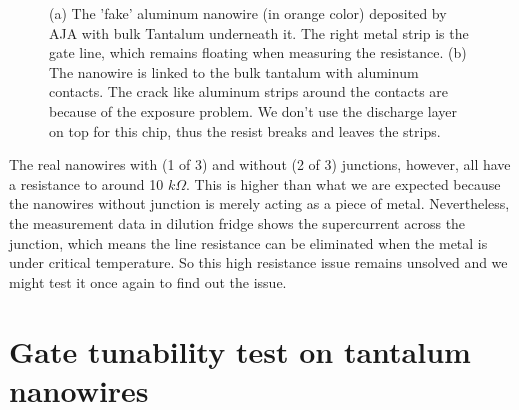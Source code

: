 \begin{figure}[h!]
\begin{subfigure}[b]{0.48\textwidth}
         \caption{}
         \label{}
     \end{subfigure}
     \caption{(a) The 'fake' aluminum nanowire (in orange color) deposited by AJA with bulk Tantalum underneath it. The right metal strip is the gate line, which remains floating when measuring the resistance. (b) The nanowire is linked to the bulk tantalum with aluminum contacts. The crack like aluminum strips around the contacts are because of the exposure problem. We don't use the discharge layer on top for this chip, thus the resist breaks and leaves the strips.}
    \label{Tamilling}
\end{figure}

The real nanowires with (1 of 3) and without (2 of 3) junctions, however, all have a resistance to around 10 $k\Omega$. This is higher than what we are expected because the nanowires without junction is merely acting as a piece of metal. Nevertheless, the measurement data in dilution fridge shows the supercurrent across the junction, which means the line resistance can be eliminated when the metal is under critical temperature. So this high resistance issue remains unsolved and we might test it once again to find out the issue. 

\section{Gate tunability test on tantalum nanowires}

